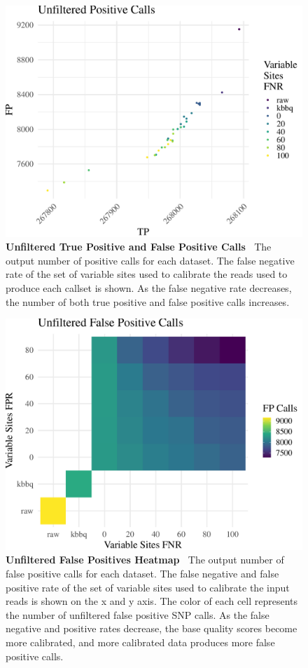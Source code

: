\documentclass{report}
\newcommand{\titlecaption}[2]{\caption[#1]{\textbf{#1 \textbar\,} #2}}
\begin{document}
\begin{figure}
\centering
\includegraphics[width = .8\textwidth]{tp_fp_plot.pdf}
\titlecaption{Unfiltered True Positive and False Positive Calls}{The output number of positive calls for each dataset. The false negative rate of the set of variable sites used to calibrate the reads used to produce each callset is shown. As the false negative rate decreases, the number of both true positive and false positive calls increases.}
\label{fig:vc_fptp}
\end{figure}

\begin{figure}
\centering
\includegraphics[width = .7\textwidth]{fp_heatmap.pdf}
\titlecaption{Unfiltered False Positives Heatmap}{The output number of false positive calls for each dataset. The false negative and false positive rate of the set of variable sites used to calibrate the input reads is shown on the x and y axis. The color of each cell represents the number of unfiltered false positive SNP calls. As the false negative and positive rates decrease, the base quality scores become more calibrated, and more calibrated data produces more false positive calls.}
\label{fig:vc_fph}
\end{figure}
\end{document}
